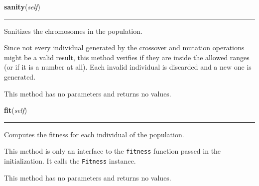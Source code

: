     \begin{boxedminipage}{\textwidth}

    \raggedright \textbf{sanity}(\textit{self})

    \vspace{-1.5ex}

    \rule{\textwidth}{0.5\fboxrule}

Sanitizes the chromosomes in the population.

Since not every individual generated by the crossover and mutation
operations might be a valid result, this method verifies if they are
inside the allowed ranges (or if it is a number at all). Each invalid
individual is discarded and a new one is generated.

This method has no parameters and returns no values.
    \vspace{1ex}

    \end{boxedminipage}

    \label{peach:ga:ga:GA:fit}

    \vspace{0.5ex}

    \begin{boxedminipage}{\textwidth}

    \raggedright \textbf{fit}(\textit{self})

    \vspace{-1.5ex}

    \rule{\textwidth}{0.5\fboxrule}

Computes the fitness for each individual of the population.

This method is only an interface to the \texttt{fitness} function passed in
the initialization. It calls the \texttt{Fitness} instance.

This method has no parameters and returns no values.
    \vspace{1ex}

    \end{boxedminipage}

    \label{peach:ga:ga:GA:step}

    \vspace{0.5ex}

